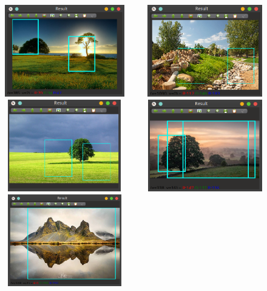 \documentclass[]{report}
\begin{document}
\begin{center}
	\includegraphics[width=6cm,height=4cm]{img/resized_window/Screenshot_20200707_191259}
	\includegraphics[width=6cm,height=4cm]{img/resized_window/Screenshot_20200707_191430}
	\includegraphics[width=6cm,height=4cm]{img/resized_window/Screenshot_20200707_191506}
	\includegraphics[width=6cm,height=4cm]{img/resized_window/Screenshot_20200707_191538}
	\includegraphics[width=6cm,height=4cm]{img/resized_window/Screenshot_20200707_191628}
\end{center}
\end{document}
